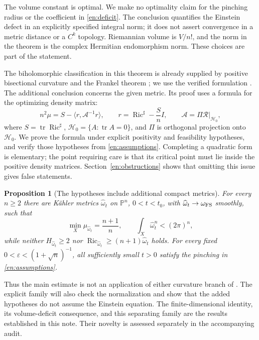 \documentclass[12pt]{amsart}
\newtheorem{prop}[thm]{Proposition}
\theoremstyle{definition}
\theoremstyle{remark}
\numberwithin{equation}{section}
\DeclareMathOperator{\Ric}{Ric}
\DeclareMathOperator{\tr}{tr}
\theoremstyle{plain}
\theoremstyle{remark}
\theoremstyle{definition}
\begin{document}
The volume constant is optimal. We make no optimality claim for the
pinching radius or the coefficient in \eqref{en:deficit}. The conclusion
quantifies the Einstein defect in an explicitly specified integral norm;
it does not assert convergence in a metric distance or a $C^k$ topology.
Riemannian volume is $V/n!$, and the norm in the theorem is the complex
Hermitian endomorphism norm. These choices are part of the statement.

The biholomorphic classification in this theorem is already supplied by
positive bisectional curvature and the Frankel theorem
\cite{en:SY}; we use the verified formulation
\cite[Theorem 0.1]{en:FLW}. The additional conclusion concerns the given
metric. Its proof uses a formula for the optimizing density matrix:
\begin{equation}\label{en:identityintro}
 n^2\mu=S-\langle r,\mathcal A^{-1}r\rangle,
 \qquad r=\Ric^\sharp-\frac Sn I,
 \qquad \mathcal A=\Pi\mathscr R|_{\mathcal H_0},
\end{equation}
where $S=\tr\Ric^\sharp$, $\mathcal H_0=\{A:\tr A=0\}$, and
$\Pi$ is orthogonal projection onto $\mathcal H_0$. We prove the formula
under explicit positivity and feasibility hypotheses, and verify those
hypotheses from \eqref{en:assumptions}. Completing a quadratic form is
elementary; the point requiring care is that its critical point must lie
inside the positive density matrices. Section~\ref{en:obstructions}
shows that omitting this issue gives false statements.

\begin{prop}[The hypotheses include additional compact metrics]\label{en:family}
For every $n\geq2$ there are K\"ahler metrics $\widehat\omega_t$ on
$\mathbb P^n$, $0<t<t_0$, with $\widehat\omega_t\to\omega_{\rm FS}$
smoothly, such that
\[
 \min_X\mu_{\widehat\omega_t}=\frac{n+1}{n},\qquad
 \int_X\widehat\omega_t^n<(2\pi)^n,
\]
while neither $H_{\widehat\omega_t}\geq2$ nor
$\Ric_{\widehat\omega_t}\geq(n+1)\widehat\omega_t$ holds.
For every fixed $0<\varepsilon<(1+\sqrt n)^{-1}$, all sufficiently small
$t>0$ satisfy the pinching in \eqref{en:assumptions}.
\end{prop}

Thus the main estimate is not an application of either curvature branch
of \cite[Corollary 1.2]{en:DS}. The explicit family will also check the
normalization and show that the added hypotheses do not assume the
Einstein equation. The finite-dimensional identity, its volume-deficit
consequence, and this separating family are the results established in
this note. Their novelty is assessed separately in the accompanying audit.
\end{document}
